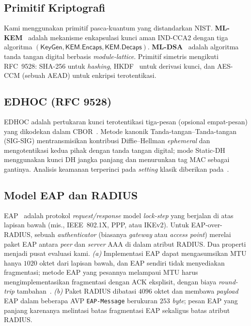 \documentclass{easychair}
\newcommand{\KemKeyGen}{\mathsf{KeyGen}}
\newcommand{\Encaps}{\mathsf{KEM.Encaps}}
\newcommand{\Decaps}{\mathsf{KEM.Decaps}}
\begin{document}
\subsection{Primitif Kriptografi}
Kami menggunakan primitif pasca-kuantum yang distandarkan NIST.
\textbf{ML-KEM}~\cite{FIPS203} adalah mekanisme enkapsulasi kunci
aman IND-CCA2 dengan tiga algoritma
$(\KemKeyGen,\Encaps,\Decaps)$. \textbf{ML-DSA}~\cite{FIPS204} adalah
algoritma tanda tangan digital berbasis \emph{module-lattice}.
Primitif simetris mengikuti RFC~9528: SHA-256 untuk \emph{hashing},
HKDF~\cite{RFC5869} untuk derivasi kunci, dan AES-CCM (sebuah AEAD)
untuk enkripsi terotentikasi.

\subsection{EDHOC (RFC 9528)}
EDHOC adalah pertukaran kunci terotentikasi tiga-pesan (opsional
empat-pesan) yang dikodekan dalam CBOR~\cite{RFC8949,RFC9052}. Metode
kanonik Tanda-tangan--Tanda-tangan (SIG-SIG) mentransmisikan
kontribusi Diffie--Hellman \emph{ephemeral} dan mengotentikasi kedua
pihak dengan tanda tangan digital; mode Static-DH menggunakan kunci
DH jangka panjang dan menurunkan tag MAC sebagai gantinya. Analisis
keamanan terperinci pada \emph{setting} klasik diberikan
pada~\cite{NSB21,CP22,GM23,JKK+23,Fer24,PSM+24}.

\subsection{Model EAP dan RADIUS}
EAP~\cite{RFC3748} adalah protokol \emph{request/response} model
\emph{lock-step} yang berjalan di atas lapisan bawah (mis., IEEE~802.1X,
PPP, atau IKEv2). Untuk EAP-over-RADIUS, sebuah \emph{authenticator}
(biasanya \emph{gateway} atau \emph{access point}) merelai paket EAP
antara \emph{peer} dan \emph{server} AAA di dalam atribut RADIUS. Dua
properti menjadi pusat evaluasi kami. \emph{(a)} Implementasi EAP
dapat mengasumsikan MTU hanya $1020$ oktet dari lapisan bawah, dan
EAP sendiri tidak menyediakan fragmentasi; metode EAP yang pesannya
melampaui MTU harus mengimplementasikan fragmentasi dengan ACK
eksplisit, dengan biaya \emph{round-trip}
tambahan~\cite{RFC3748,RFC9191}. \emph{(b)} Paket RADIUS dibatasi
$4096$ oktet dan membawa \emph{payload} EAP dalam beberapa AVP
\texttt{EAP-Message} berukuran $253$ \emph{byte}; pesan EAP yang
panjang karenanya melintasi batas fragmentasi EAP sekaligus batas
atribut RADIUS.
\end{document}
